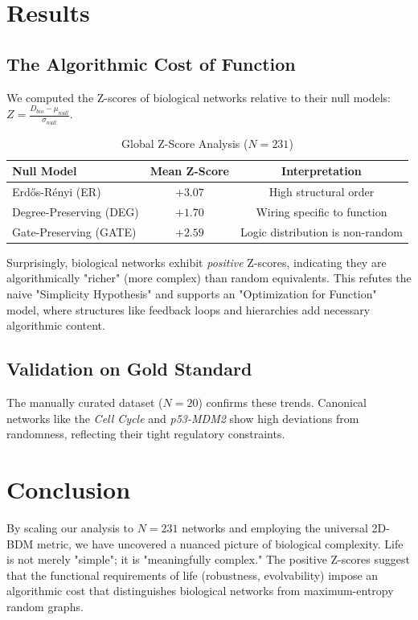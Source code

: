 \documentclass{article}
\begin{document}
\section{Results}

\subsection{The Algorithmic Cost of Function}
We computed the Z-scores of biological networks relative to their null models: $Z = \frac{D_{bio} - \mu_{null}}{\sigma_{null}}$.
\begin{table}[H]
\centering
\caption{Global Z-Score Analysis ($N=231$)}
\begin{tabular}{l c c}
\toprule
\textbf{Null Model} & \textbf{Mean Z-Score} & \textbf{Interpretation} \\ \midrule
Erdős-Rényi (ER) & $+3.07$ & High structural order \\
Degree-Preserving (DEG) & $+1.70$ & Wiring specific to function \\
Gate-Preserving (GATE) & $+2.59$ & Logic distribution is non-random \\
\bottomrule
\end{tabular}
\end{table}

Surprisingly, biological networks exhibit \textit{positive} Z-scores, indicating they are algorithmically "richer" (more complex) than random equivalents. This refutes the naive "Simplicity Hypothesis" and supports an "Optimization for Function" model, where structures like feedback loops and hierarchies add necessary algorithmic content.

\subsection{Validation on Gold Standard}
The manually curated dataset ($N=20$) confirms these trends. Canonical networks like the \textit{Cell Cycle} and \textit{p53-MDM2} show high deviations from randomness, reflecting their tight regulatory constraints.

\section{Conclusion}
By scaling our analysis to $N=231$ networks and employing the universal 2D-BDM metric, we have uncovered a nuanced picture of biological complexity. Life is not merely "simple"; it is "meaningfully complex." The positive Z-scores suggest that the functional requirements of life (robustness, evolvability) impose an algorithmic cost that distinguishes biological networks from maximum-entropy random graphs.
\end{document}
